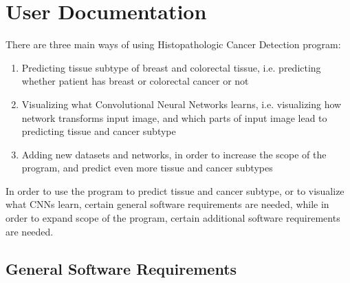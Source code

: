 \chapter{User Documentation} %
\label{ch:user}

There are three main ways of using Histopathologic Cancer Detection program:
\begin{enumerate}
	\itemsep 0em
	\item Predicting tissue subtype of breast and colorectal tissue, i.e. predicting whether patient has breast or colorectal cancer or not
	\item Visualizing what Convolutional Neural Networks learns, i.e. visualizing how network transforms input image, and which parts of input image lead to predicting tissue and cancer subtype
	\item Adding new datasets and networks, in order to increase the scope of the program, and predict even more tissue and cancer subtypes
\end{enumerate}
In order to use the program to predict tissue and cancer subtype, or to visualize what CNNs learn, certain general software requirements are needed, while in order to expand scope of the program, certain additional software requirements are needed.

\section{General Software Requirements}

